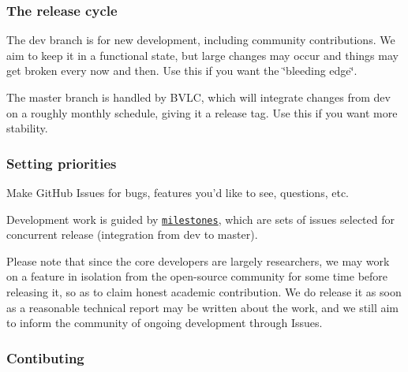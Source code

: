 \subsubsection*{The release cycle}


\begin{DoxyItemize}
\item The {\ttfamily dev} branch is for new development, including community contributions. We aim to keep it in a functional state, but large changes may occur and things may get broken every now and then. Use this if you want the \char`\"{}bleeding edge\char`\"{}.
\item The {\ttfamily master} branch is handled by B\+V\+L\+C, which will integrate changes from {\ttfamily dev} on a roughly monthly schedule, giving it a release tag. Use this if you want more stability.
\end{DoxyItemize}

\subsubsection*{Setting priorities}


\begin{DoxyItemize}
\item Make Git\+Hub Issues for bugs, features you'd like to see, questions, etc.
\item Development work is guided by \href{https://github.com/BVLC/caffe/issues?milestone=1}{\tt milestones}, which are sets of issues selected for concurrent release (integration from {\ttfamily dev} to {\ttfamily master}).
\item Please note that since the core developers are largely researchers, we may work on a feature in isolation from the open-\/source community for some time before releasing it, so as to claim honest academic contribution. We do release it as soon as a reasonable technical report may be written about the work, and we still aim to inform the community of ongoing development through Issues.
\end{DoxyItemize}

\subsubsection*{Contibuting}


